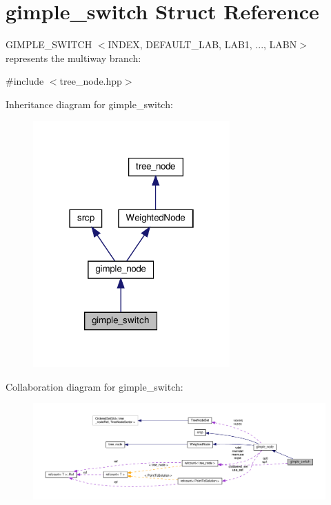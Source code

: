 \hypertarget{structgimple__switch}{}\section{gimple\+\_\+switch Struct Reference}
\label{structgimple__switch}


G\+I\+M\+P\+L\+E\+\_\+\+S\+W\+I\+T\+CH $<$I\+N\+D\+EX, D\+E\+F\+A\+U\+L\+T\+\_\+\+L\+AB, L\+A\+B1, ..., L\+A\+BN$>$ represents the multiway branch\+:  




{\ttfamily \#include $<$tree\+\_\+node.\+hpp$>$}



Inheritance diagram for gimple\+\_\+switch\+:
\nopagebreak
\begin{figure}[H]
\begin{center}
\leavevmode
\includegraphics[width=214pt]{d6/dc6/structgimple__switch__inherit__graph}
\end{center}
\end{figure}


Collaboration diagram for gimple\+\_\+switch\+:
\nopagebreak
\begin{figure}[H]
\begin{center}
\leavevmode
\includegraphics[width=350pt]{d9/d6e/structgimple__switch__coll__graph}
\end{center}
\end{figure}
